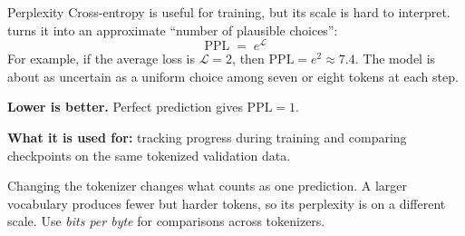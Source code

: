 \documentclass[aspectratio=169,10pt]{beamer}
\begin{document}
\begin{frame}[shrink=8]{Perplexity}
  Cross-entropy is useful for training, but its scale is hard to interpret.
   turns it into an approximate ``number of plausible choices'':
  \[
    \mathrm{PPL} \;=\; e^{\mathcal{L}}
  \]
  For example, if the average loss is $\mathcal{L}=2$, then
  $\mathrm{PPL}=e^2\approx 7.4$. The model is about as uncertain as a uniform
  choice among seven or eight tokens at each step.
  \vspace{0.3em}

  \textbf{Lower is better.} Perfect prediction gives $\mathrm{PPL}=1$.
  \vspace{0.3em}

  \textbf{What it is used for:} tracking progress during training and
  comparing checkpoints on the same tokenized validation data.
  \vfill
  \begin{gotcha}
    Changing the tokenizer changes what counts as one prediction. A larger
    vocabulary produces fewer but harder tokens, so its perplexity is on a
    different scale. Use \emph{bits per byte} for comparisons across
    tokenizers.
  \end{gotcha}
\end{frame}
\end{document}
